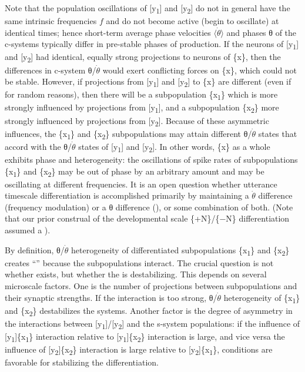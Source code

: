   Note that the population oscillations of [y\textsubscript{1}] and [y\textsubscript{2}] do not in general have the same intrinsic frequencies $f$ and do not become active (begin to oscillate) at identical times; hence short-term average phase velocities $\langle\dot{\theta}\rangle$ and phases θ of the c-systems typically differ in pre-stable phases of production. If the neurons of [y\textsubscript{1}] and [y\textsubscript{2}] had identical, equally strong projections to neurons of \{x\}, then the differences in c-system θ/$\dot{\theta}$ would exert conflicting forces on \{x\}, which could not be stable. However, if projections from [y\textsubscript{1}] and [y\textsubscript{2}] to \{x\} are different (even if for random reasons), then there will be a subpopulation \{x\textsubscript{1}\} which is more strongly influenced by projections from [y\textsubscript{1}], and a subpopulation \{x\textsubscript{2}\} more strongly influenced by projections from [y\textsubscript{2}]. Because of these asymmetric influences, the \{x\textsubscript{1}\} and \{x\textsubscript{2}\} subpopulations may attain different θ/$\dot{\theta}$ states that accord with the θ/$\dot{\theta}$ states of [y\textsubscript{1}] and [y\textsubscript{2}]. In other words, \{x\} as a whole exhibits phase and  heterogeneity: the oscillations of spike rates of subpopulations \{x\textsubscript{1}\} and \{x\textsubscript{2}\} may be out of phase by an arbitrary amount and may be oscillating at different frequencies. It is an open question whether utterance timescale differentiation is accomplished primarily by maintaining a $\dot{\theta}$ difference (frequency modulation) or a θ difference (), or some combination of both. (Note that our prior construal of the developmental scale \{+N\}/\{−N\} differentiation assumed a ).

  By definition, θ/$\dot{\theta}$ heterogeneity of differentiated subpopulations \{x\textsubscript{1}\} and \{x\textsubscript{2}\} creates “” because the subpopulations interact. The crucial question is not whether  exists, but whether the  is destabilizing. This depends on several microscale factors. One is the number of projections between subpopulations and their synaptic strengths. If the interaction is too strong, θ/$\dot{\theta}$ heterogeneity of \{x\textsubscript{1}\} and \{x\textsubscript{2}\} destabilizes the systems. Another factor is the degree of asymmetry in the interactions between [y\textsubscript{1}]/[y\textsubscript{2}] and the s-system populations: if the influence of [y\textsubscript{1}]\{x\textsubscript{1}\} interaction relative to [y\textsubscript{1}]\{x\textsubscript{2}\} interaction is large, and vice versa the influence of [y\textsubscript{2}]\{x\textsubscript{2}\} interaction is large relative to [y\textsubscript{2}]\{x\textsubscript{1}\}, conditions are favorable for stabilizing the differentiation.


